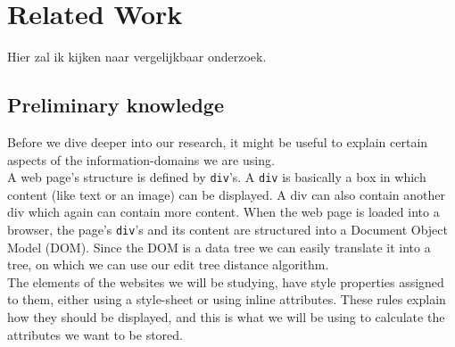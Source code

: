 \chapter{Related Work}\label{relatedwork}
Hier zal ik kijken naar vergelijkbaar onderzoek.

\section{Preliminary knowledge}
Before we dive deeper into our research, it might be useful to explain certain aspects of the information-domains we are using.
\\ A web page's structure is defined by \texttt{div}'s. A \texttt{div} is basically a box in which content (like text or an image) can be displayed. A div can also contain another div which again can contain more content. When the web page is loaded into a browser, the page's \texttt{div}'s and its content are structured into a Document Object Model (DOM). Since the DOM is a data tree we can easily translate it into a tree, on which we can use our edit tree distance algorithm.
\\ The elements of the websites we will be studying, have style properties assigned to them, either using a style-sheet or using inline attributes. These rules explain how they should be displayed, and this is what we will be using to calculate the attributes we want to be stored.
